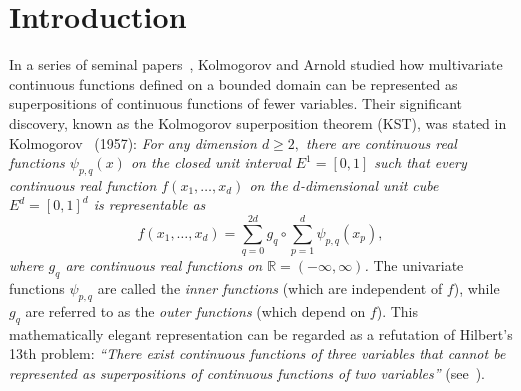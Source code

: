 \documentclass[10pt,reqno,final]{amsart}
\theoremstyle{remark}
\theoremstyle{definition}
\newcommand{\wll}[1]{#1}
\begin{document}
\begin{abstract} We explicitly construct an approximate version of the \wll{Kolmogorov superpositions}, which is composed of $C^2$-inner and outer functions, and  can approximate an  arbitrary $\alpha$-H\"older continuous function  $f\in {\mathcal H}^{\alpha}([0,1]^d),\, \alpha\in (0,1]$ with accuracy \wll{$O(N^{-\alpha})$,}  where 
$N$ denotes the number of outer summations.   The inner functions are generated by applying suitable translations and dilations to a piecewise $C^2,$ strictly-increasing function, while the outer functions are constructed row-wise through piecewise $C^2$-interpolation using newly designed shape functions. This novel variant of Kolmogorov superpositions overcomes the ``wild'' and ``pathological'' behaviors of the inherent single variable functions, but retains the essence of Kolmogorov's strategy of exact representation---an objective that Sprecher (Neural Netw. (2021)–442) has actively pursued.  We also discuss the implications of this new construction and demonstrate its applicability to related neural networks.
\end{abstract}

\maketitle


\vspace*{-12pt}

\section{Introduction}
\setcounter{equation}{0}
\setcounter{lmm}{0}
\setcounter{thm}{0}



 In a series of seminal papers~\cite{Kolmogorov1956,Arnold1957a,Arnold1957b,Kolmogorov1957}, Kolmogorov and Arnold studied how multivariate continuous functions defined on a bounded domain can be represented as superpositions of continuous functions of fewer variables.
 Their significant discovery, known as the \wll{Kolmogorov superposition theorem (KST)}, was stated in Kolmogorov~\cite{Kolmogorov1957} (1957):
 {\em For any dimension $d \geq 2,$ there are continuous real functions $\psi_{p, q}(x)$ on the closed unit interval $E^1=[0, 1]$ such that every continuous real function $f(x_1, \ldots, x_d)$ on the $d$-dimensional unit cube $E^d=[0,1]^d$ is representable as}
\begin{equation}\label{KART-0}
f(x_1, \ldots, x_d)=\sum_{q=0}^{2 d} g_q\circ \sum_{p=1}^d \psi_{p, q}(x_p),
\end{equation}
{\em where $g_q$ are continuous real functions on $\mathbb R=(-\infty,\infty)$.} The univariate functions  $\psi_{p,q}$ are called the {\em inner functions} (which are  independent of $f$), while $g_q$ are referred to as the {\em outer functions} (which depend on $f$).  This mathematically elegant representation can be regarded as a refutation of Hilbert's 13th problem: {\em ``There exist continuous functions of three variables that cannot be represented as superpositions of continuous functions of two variables''} (see~\cite{Girosi1989}). 
\end{document}
